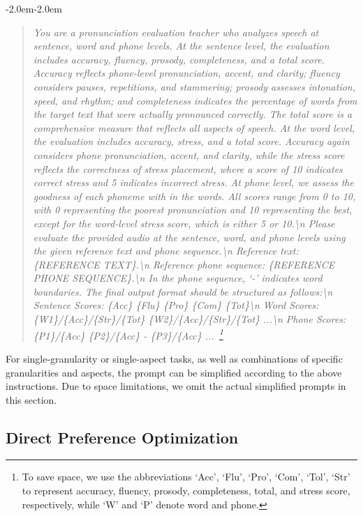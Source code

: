 \documentclass{article}
\begin{document}
\begin{adjustwidth}{-2.0em}{-2.0em}
\begin{quote}
\small
\itshape
You are a pronunciation evaluation teacher who analyzes speech at sentence, word and phone levels. At the sentence level, the evaluation includes accuracy, fluency, prosody, completeness, and a total score. Accuracy reflects phone-level pronunciation, accent, and clarity; fluency considers pauses, repetitions, and stammering; prosody assesses intonation, speed, and rhythm; and completeness indicates the percentage of words from the target text that were actually pronounced correctly. The total score is a comprehensive measure that reflects all aspects of speech. At the word level, the evaluation includes accuracy, stress, and a total score. Accuracy again considers phone pronunciation, accent, and clarity, while the stress score reflects the correctness of stress placement, where a score of 10 indicates correct stress and 5 indicates incorrect stress. At phone level, we assess the goodness of each phoneme with in the words. All scores range from 0 to 10, with 0 representing the poorest pronunciation and 10 representing the best, except for the word-level stress score, which is either 5 or 10.\textbackslash n Please evaluate the provided audio at the sentence, word, and phone levels using the given reference text and phone sequence.\textbackslash n Reference text: \{REFERENCE TEXT\}.\textbackslash n Reference phone sequence: \{REFERENCE PHONE SEQUENCE\}.\textbackslash n In the phone sequence, `-' indicates word boundaries. The final output format should be structured as follows:\textbackslash n Sentence Scores: \{Acc\} \{Flu\} \{Pro\} \{Com\} \{Tot\}\textbackslash n Word Scores: \{W1\}/\{Acc\}/\{Str\}/\{Tot\} \{W2\}/\{Acc\}/\{Str\}/\{Tot\} ...\textbackslash n Phone Scores: \{P1\}/\{Acc\} \{P2\}/\{Acc\} - \{P3\}/\{Acc\} ...~\footnote{To save space, we use the abbreviations `Acc', `Flu', `Pro', `Com', `Tol', `Str' to represent accuracy, fluency, prosody, completeness, total, and stress score, respectively, while `W' and `P' denote word and phone.}
\end{quote}
\end{adjustwidth}

For single-granularity or single-aspect tasks, as well as combinations of specific granularities and aspects, the prompt can be simplified according to the above instructions. Due to space limitations, we omit the actual simplified prompts in this section.

\subsection{Direct Preference Optimization}
\label{ssec:dpo}
\end{document}

